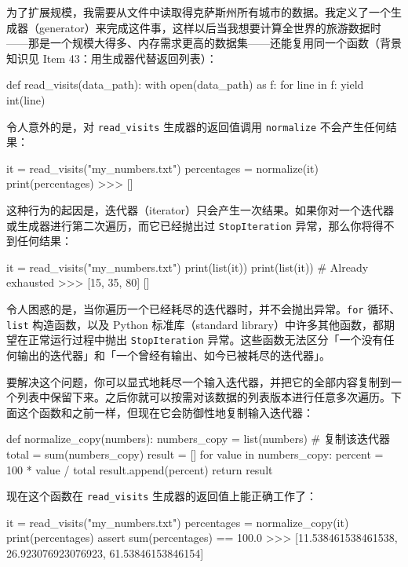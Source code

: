 为了扩展规模，我需要从文件中读取得克萨斯州所有城市的数据。我定义了一个生成器（generator）来完成这件事，这样以后当我想要计算全世界的旅游数据时——那是一个规模大得多、内存需求更高的数据集——还能复用同一个函数（背景知识见 Item 43：用生成器代替返回列表）：

\begin{codebox}[python]
def read_visits(data_path):
    with open(data_path) as f:
        for line in f:
            yield int(line)
\end{codebox}

令人意外的是，对 \texttt{read\_visits} 生成器的返回值调用 \texttt{normalize} 不会产生任何结果：

\begin{codebox}[python]
it = read_visits("my_numbers.txt")
percentages = normalize(it)
print(percentages)
>>>
[]
\end{codebox}

这种行为的起因是，迭代器（iterator）只会产生一次结果。如果你对一个迭代器或生成器进行第二次遍历，而它已经抛出过 \texttt{StopIteration} 异常，那么你将得不到任何结果：

\begin{codebox}[python]
it = read_visits("my_numbers.txt")
print(list(it))
print(list(it))  # Already exhausted
>>>
[15, 35, 80]
[]
\end{codebox}

令人困惑的是，当你遍历一个已经耗尽的迭代器时，并不会抛出异常。\texttt{for} 循环、\texttt{list} 构造函数，以及 Python 标准库（standard library）中许多其他函数，都期望在正常运行过程中抛出 \texttt{StopIteration} 异常。这些函数无法区分「一个没有任何输出的迭代器」和「一个曾经有输出、如今已被耗尽的迭代器」。

要解决这个问题，你可以显式地耗尽一个输入迭代器，并把它的全部内容复制到一个列表中保留下来。之后你就可以按需对该数据的列表版本进行任意多次遍历。下面这个函数和之前一样，但现在它会防御性地复制输入迭代器：

\begin{codebox}[python]
def normalize_copy(numbers):
    numbers_copy = list(numbers)  # 复制该迭代器
    total = sum(numbers_copy)
    result = []
    for value in numbers_copy:
        percent = 100 * value / total
        result.append(percent)
    return result
\end{codebox}

现在这个函数在 \texttt{read\_visits} 生成器的返回值上能正确工作了：

\begin{codebox}[python]
it = read_visits("my_numbers.txt")
percentages = normalize_copy(it)
print(percentages)
assert sum(percentages) == 100.0
>>>
[11.538461538461538, 26.923076923076923, 61.53846153846154]
\end{codebox}

